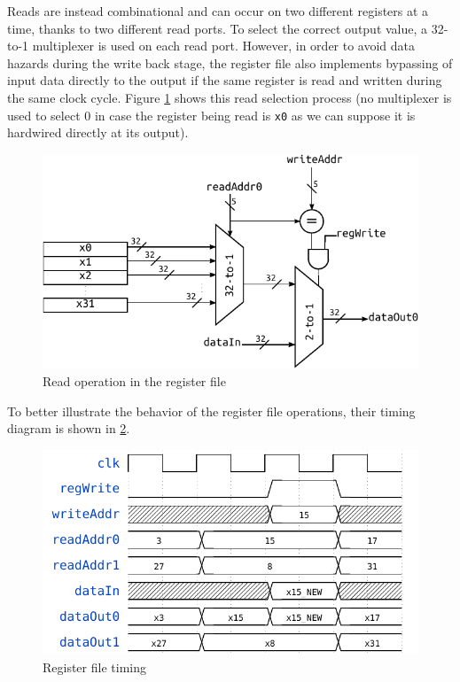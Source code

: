 \documentclass[a4paper]{article}
\begin{document}
Reads are instead combinational and can occur on two different registers at a time, thanks to two different read ports. To select the correct output value, a 32-to-1 multiplexer is used on each read port. However, in order to avoid data hazards during the write back stage, the register file also implements bypassing of input data directly to the output if the same register is read and written during the same clock cycle. Figure \ref{fig:rf_read} shows this read selection process (no multiplexer is used to select 0 in case the register being read is \texttt{x0} as we can suppose it is hardwired directly at its output).

\begin{figure}[hbtp]
    \centering
    \includegraphics{../register_file/ref/schematic/register_file_deep.pdf}
    \caption{Read operation in the register file}
    \label{fig:rf_read}
\end{figure}

To better illustrate the behavior of the register file operations, their timing diagram is shown in \ref{fig:rf_timing}.

\begin{figure}[hbtp]
    \centering
    \includegraphics[scale=.8]{../register_file/ref/timing/rf_timing.pdf}
    \caption{Register file timing}
    \label{fig:rf_timing}
\end{figure}
\end{document}
